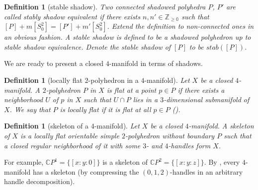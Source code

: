 \documentclass[12pt]{extarticle}
\numberwithin{equation}{section} %
\theoremstyle{mystyle}
\newtheorem{definition}[equation]{Definition}
\begin{document}
\begin{definition}[stable shadow]\label{def/stable-shadow}
  Two connected shadowed polyhedra $P$, $P'$ are called stably
  shadow equivalent if there exists
  $n, n' \in \mathbb{Z_{\geq 0}}$ such that
  $[P] + m[S^{2}_{0}] = [P'] + m'[S^{2}_{0}]$. Extend the
  definition to non-connected ones in an obvious fashion. A
  stable shadow is defined to be a shadowed polyhedron up to
  stable shadow equivalence. Denote the stable shadow of $[P]$ to
  be $stab([P])$.
\end{definition}

\noindent We are ready to present a closed $4$-manifold in terms
of shadows.

\begin{definition}[locally flat $2$-polyhedron in a
  $4$-manifold]\label{def/locally-flat-2-polyhedron-in-a-4-manifold}
  Let $X$ be a closed $4$-manifold. A $2$-polyhedron $P$ in $X$
  is flat at a point $p \in P$ if there exists a neighborhood $U$
  of $p$ in $X$ such that $U \cap P$ lies in a $3$-dimensional
  submanifold of $X$. We say that $P$ is locally flat if it is
  flat at all $p \in P$ (\cite[p.394]{turaev-qiok-3-manifolds}).
\end{definition}

\begin{definition}[skeleton of a $4$-manifold]\label{def/skeleton-of-a-4-manifold}
  Let $X$ be a closed $4$-manifold. A skeleton
  \cite[p.395]{turaev-qiok-3-manifolds} of $X$ is a locally flat
  orientable simple $2$-polyhedron without boundary $P$ such that
  a closed regular neighborhood of it with some $3$- and
  $4$-handles form $X$.
\end{definition}

\noindent For example, $\mathbb{C}P^{1} = \{[x:y:0]\}$ is a
skeleton of $\mathbb{C}P^{2} = \{[x:y:z]\}$. By \cite[theorem
IX.1.5]{turaev-qiok-3-manifolds}, every $4$-manifold has a
skeleton (by compressing the $(0,1,2)$-handles in an arbitrary
handle decomposition).
\end{document}
